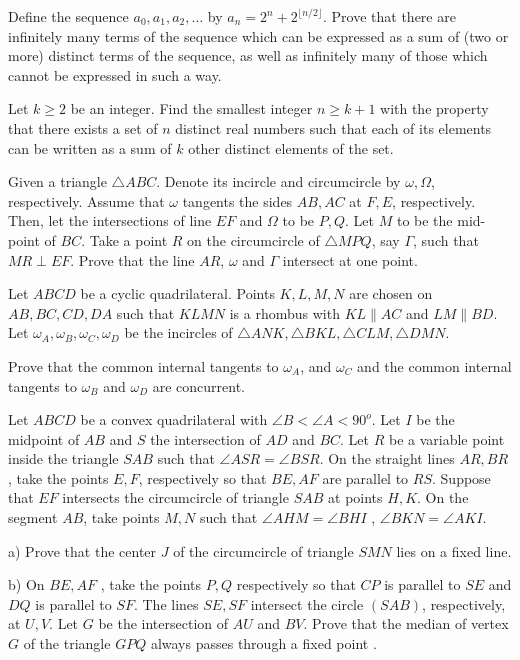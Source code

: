 \documentclass[11pt]{scrartcl}
\begin{document}
\begin{problem}[8609709793627283757]
	Define the sequence $a_0,a_1,a_2,\hdots$ by $a_n=2^n+2^{\lfloor n/2\rfloor}$. Prove that there are infinitely many terms of the sequence which can be expressed as a sum of (two or more) distinct terms of the sequence, as well as infinitely many of those which cannot be expressed in such a way.
\end{problem}
\begin{problem}[1837105952530316058]
Let $k\ge2$ be an integer. Find the smallest integer $n \ge k+1$ with the property that there exists a set of $n$ distinct real numbers such that each of its elements can be written as a sum of $k$ other distinct elements of the set.
\end{problem}
\begin{problem}[1965233157265405983]
Given a triangle $ \triangle{ABC} $. Denote its incircle and circumcircle by $ \omega, \Omega $, respectively. Assume that $ \omega $ tangents the sides $ AB, AC $ at $ F, E $, respectively. Then, let the intersections of line $ EF $ and $ \Omega $ to be $ P,Q $. Let $ M $ to be the mid-point of $ BC $. Take a point $ R $ on the circumcircle of $ \triangle{MPQ} $, say $ \Gamma $, such that $ MR \perp EF $. Prove that the line $ AR $, $ \omega $ and $ \Gamma $ intersect at one point.
\end{problem}
\begin{problem}[5299971832672937326]
Let $ABCD$ be a cyclic quadrilateral. Points $K, L, M, N$ are chosen on $AB, BC, CD, DA$ such that $KLMN$ is a rhombus with $KL \parallel AC$ and $LM \parallel BD$. Let $\omega_A, \omega_B, \omega_C, \omega_D$ be the incircles of $\triangle ANK, \triangle BKL, \triangle CLM, \triangle DMN$.

Prove that the common internal tangents to $\omega_A$, and $\omega_C$ and the common internal tangents to $\omega_B$ and $\omega_D$ are concurrent.
\end{problem}
\begin{problem}[1613309914397651478]
Let $ABCD$ be a convex quadrilateral with $\angle B < \angle A < 90^{o}$. Let $I$ be the midpoint of $AB$ and $S$ the intersection of $AD$ and $BC$. Let $R$ be a variable point inside the triangle $SAB$ such that $\angle ASR = \angle BSR$. On the straight lines $AR, BR$ , take the points $E, F$, respectively so that $BE , AF$ are parallel to $RS$. Suppose that $EF$ intersects the circumcircle of triangle $SAB$ at points $H, K$. On the segment $AB$, take points $M , N$ such that $\angle AHM =\angle BHI$ , $\angle BKN = \angle AKI$.

a) Prove that the center $J$ of the circumcircle of triangle $SMN$ lies on a fixed line.

b) On $BE, AF$ , take the points $P, Q$ respectively so that $CP$ is parallel to $SE$ and $DQ$ is parallel to $SF$. The lines $SE, SF$ intersect the circle $(SAB)$, respectively, at $U, V$. Let $G$ be the intersection of $AU$ and $BV$. Prove that the median of vertex $G$ of the triangle $GPQ$ always passes through a fixed point .
\end{problem}
\end{document}
